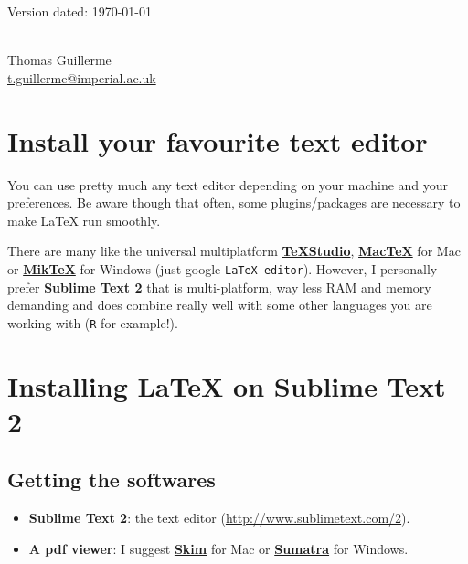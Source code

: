 \documentclass[a4paper,11pt]{article}
\begin{document}
\begin{flushright}
Version dated: \today
\end{flushright}
\begin{center}

\\
\bigskip
Thomas Guillerme\\\href{mailto:t.guillerme@imperial.ac.uk}{t.guillerme@imperial.ac.uk}

\end{center}

\section{Install your favourite text editor}
You can use pretty much any text editor depending on your machine and your preferences.
Be aware though that often, some plugins/packages are necessary to make LaTeX run smoothly.

There are many like the universal multiplatform \href{http://texstudio.sourceforge.net/}{\textbf{TeXStudio}}, \href{http://www.tug.org/mactex/index.html}{\textbf{MacTeX}} for Mac or \href{http://miktex.org/}{\textbf{MikTeX}} for Windows (just google \texttt{LaTeX editor}).
However, I personally prefer \textbf{Sublime Text 2} that is multi-platform, way less RAM and memory demanding and does combine really well with some other languages you are working with (\texttt{R} for example!).

\section{Installing LaTeX on Sublime Text 2}
\subsection{Getting the softwares}
\begin{itemize}
\item \textbf{Sublime Text 2}: the text editor (\url{http://www.sublimetext.com/2}).
\item \textbf{A pdf viewer}: I suggest \href{http://skim-app.sourceforge.net/}{\textbf{Skim}} for Mac or \href{http://www.sumatrapdfreader.org/download-free-pdf-viewer.html}{\textbf{Sumatra}} for Windows.
\end{itemize}
\end{document}
